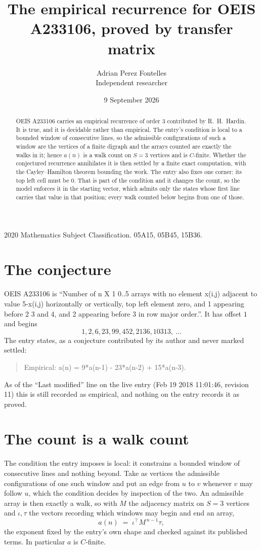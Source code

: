 \documentclass[11pt,a4paper]{article}
\title{The empirical recurrence for OEIS A233106, proved by transfer matrix}
\author{Adrian Perez Fontelles\\ \small Independent researcher}
\date{9 September 2026}
\theoremstyle{plain}
\theoremstyle{definition}
\begin{document}
\maketitle

\begin{abstract}
OEIS A233106 carries an empirical recurrence of order $3$ contributed by R.~H.~Hardin. It is
true, and it is decidable rather than empirical. The entry's condition is local to a bounded window of consecutive lines, so
the admissible configurations of such a window are the vertices of a finite digraph and the
arrays counted are exactly the walks in it; hence $a(n)$ is a walk count on $S=3$ vertices
and is $C$-finite. Whether the conjectured recurrence annihilates it is then settled by a
finite exact computation, with the Cayley--Hamilton theorem bounding the work.
 The entry also fixes one corner: its top left cell must be $0$. That is part of the condition and it changes the count, so the model enforces it in the starting vector, which admits only the states whose first line carries that value in that position; every walk counted below begins from one of those.\end{abstract}

\noindent\small 2020 Mathematics Subject Classification. 05A15, 05B45, 15B36.\normalsize

\section{The conjecture}

OEIS A233106 is ``Number of n X 1 0..5 arrays with no element x(i,j) adjacent to value 5-x(i,j) horizontally or vertically, top left element zero, and 1 appearing before 2 3 and 4, and 2 appearing before 3 in row major order.''. It has offset $1$ and begins
\[
1, 2, 6, 23, 99, 452, 2136, 10313,\ \dots
\]
The entry states, as a conjecture contributed by its author and never marked settled:
\begin{quote}
Empirical: a(n) = 9*a(n-1) - 23*a(n-2) + 15*a(n-3).
\end{quote}
As of the ``Last modified'' line on the live entry (Feb 19 2018 11:01:46, revision 11) this is still
recorded as empirical, and nothing on the entry records it as proved.

\section{The count is a walk count}

The condition the entry imposes is local: it constrains a bounded window of consecutive lines and nothing beyond. Take as
vertices the admissible configurations of one such window and put an edge from $u$ to $v$
whenever $v$ may follow $u$, which the condition decides by inspection of the two. An
admissible array is then exactly a walk, so with $M$ the adjacency matrix on $S=3$ vertices
and $\iota,\tau$ the vectors recording which windows may begin and end an array,
\[
a(n)\;=\;\iota^{\!\top}M^{\,n-1}\tau ,
\]
the exponent fixed by the entry's own shape and checked against its published terms. In
particular $a$ is $C$-finite.
\end{document}
